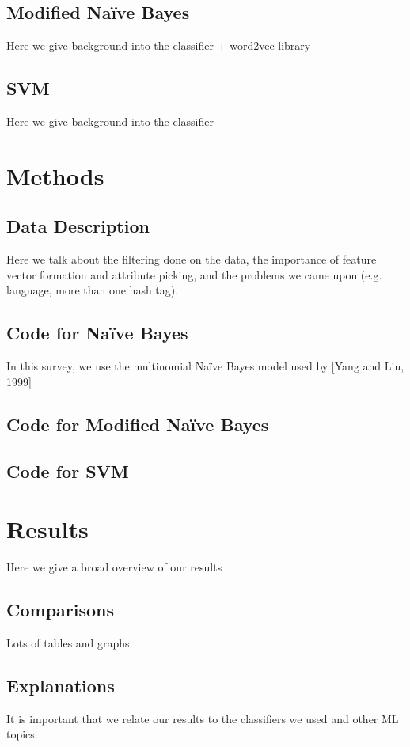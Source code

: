 \documentclass[11pt,letterpaper]{article}
\begin{document}
\subsection{Modified Na{\"i}ve Bayes}
Here we give background into the classifier + word2vec library

\subsection{SVM}
Here we give background into the classifier

\section{Methods}
\subsection{Data Description}
Here we talk about the filtering done on the data, the importance of feature vector formation and attribute picking, and the problems we came upon (e.g. language, more than one hash tag).

\subsection{Code for Na{\"i}ve Bayes}
  In this survey, we use the multinomial Na{\"i}ve Bayes model used by [Yang and Liu, 1999]

\subsection{Code for Modified Na{\"i}ve Bayes}

\subsection{Code for SVM}

\section{Results}
Here we give a broad overview of our results

\subsection{Comparisons}
Lots of tables and graphs

\subsection{Explanations}
It is important that we relate our results  to the classifiers we used and other ML topics.
\end{document}

